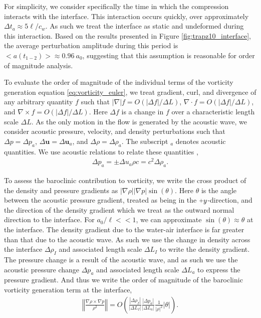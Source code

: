 \documentclass{jfm}%
\newcommand{\orderof}[1]{\ensuremath{\textit{O}\left(#1\right)}}
\newcommand{\abs}[1]{\ensuremath{\left|#1\right|}}
\newcommand{\norm}[1]{\ensuremath{\left\Vert#1\right\Vert}}
\newcommand{\plus}{\raisebox{.2\height}{\scalebox{.8}{+}}}
\begin{document}
For simplicity, we consider specifically the time in which the
compression interacts with the interface. This interaction occurs
quickly, over approximately $\Delta t_a\approx5\ell/c_{w}$. As such we
treat the interface as static and undeformed during this
interaction. Based on the results presented in Figure
\ref{fig:trapz10_interface}, the average perturbation amplitude during
this period is $<a(t_{1-2})>\approx0.96\ a_0$, suggesting that this
assumption is reasonable for order of magnitude analysis.

To evaluate the order of magnitude of the individual terms of the
vorticity generation equation \eqref{eq:vorticity_euler}, we treat
gradient, curl, and divergence of any arbitrary quantity $f$ such that
$\abs{\nabla} f= \orderof{\left|\Delta f\right|/\Delta L}$,
$\nabla\cdot f=\orderof{\left|\Delta f\right|/\Delta L}$, and
$\nabla\times f=\orderof{\left|\Delta f\right|/\Delta L}$. Here
$\Delta f$ is a change in $f$ over a characteristic length scale
$\Delta L$. As the only motion in the flow is generated by the
acoustic wave, we consider acoustic pressure, velocity, and density
perturbations such that $\Delta p=\Delta p_a$,
$\Delta \boldsymbol{u}=\Delta \boldsymbol{u}_a$, and
$\Delta \rho=\Delta \rho_a$. The subscript $_a$ denotes acoustic
quantities. We use acoustic relations to relate these quantities
\citep{Anderson1990},
\begin{align}%
  \label{eq:acoustic_relations}%
  \Delta p_a=\pm\Delta u_a \rho c=c^2\Delta \rho_a.%
\end{align}

To assess the baroclinic contribution to vorticity, we write the cross
product of the density and pressure gradients as
$\abs{\nabla \rho} \abs{\nabla p} \sin{\left(\theta\right)}$. Here
$\theta$ is the angle between the acoustic pressure gradient, treated
as being in the $\plus y$-direction, and the direction of the density
gradient which we treat as the outward normal direction to the
interface. For $a_0/\ell<<1$, we can approximate
$\sin{\left(\theta\right)}\approx\theta$ at the interface. The density
gradient due to the water-air interface is far greater than that due
to the acoustic wave. As such we use the change in density across the
interface $\Delta \rho_I$ and associated length scale $\Delta L_I$ to
write the density gradient. The pressure change is a result of the
acoustic wave, and as such we use the acoustic pressure change
$\Delta p_a$ and associated length scale $\Delta L_a$ to express the
pressure gradient. And thus we write the order of magnitude of the
baroclinic vorticity generation term at the interface,
\begin{align}
  \label{eq:baroclinic_vorticity}%
  \norm{\frac{\nabla\rho\times\nabla p}{\rho^2}} =%
  \orderof{\frac{\abs{\Delta \rho_I}}{\abs{\Delta L_I}}\frac{\abs{\Delta p_a}}{\abs{\Delta L_a}}\frac{1}{\abs{\rho}^2}\abs{\theta}}.%
\end{align}
\end{document}
